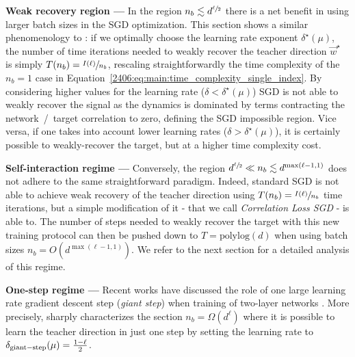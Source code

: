 \textbf{Weak recovery region ---} In the region $n_b \lesssim d^{\sfrac{\ell}{2}}$ there is a net benefit in using larger batch sizes in the SGD optimization. 
This section shows a similar phenomenology to \cite{arous2021online}: if we optimally choose the learning rate exponent $\delta^\star(\mu)$, the number of time iterations needed to weakly recover the teacher direction $\vec w^\star$ is simply $T(n_b) = \sfrac{I(\ell)}{n_b}$, rescaling straightforwardly the time complexity of the $n_b=1$ case in Equation~\eqref{2406:eq:main:time_complexity_single_index}. By considering higher values for the learning rate ($\delta < \delta^\star(\mu)$) SGD is not able to weakly recover the signal as the dynamics is dominated by terms contracting the network~/~target correlation to zero, defining the SGD impossible region. Vice versa, if one takes into account lower learning rates ($\delta > \delta^\star(\mu)$), it is certainly possible to weakly-recover the target, but at a higher time complexity cost. 

\textbf{Self-interaction regime --- } Conversely, the region $d^{\sfrac{\ell}{2}} \ll n_b \lesssim d^{{\rm max} (\ell-1,1)}$ does not adhere to the same straightforward paradigm. 
Indeed, standard SGD is not able to achieve weak recovery of the teacher direction using $T(n_b)  =  \sfrac{I(\ell)}{n_b}$ time iterations, but a simple modification of it - that we call \emph{Correlation Loss SGD} - is able to. The number of steps needed to weakly recover the target with this new training protocol can then be pushed down to \(T=\mathrm{polylog}(d)\) when using batch sizes $n_b = O(d^{\max (\ell-1,1)})$. We refer to the next section for a detailed analysis of this regime.
 
\textbf{One-step regime ---} Recent works have discussed the role of one large learning rate gradient descent step (\textit{giant step}) when training of two-layer networks \citep{ba2022high,damian2022neural,dandi2023how}. More precisely, \cite{dandi2023how} sharply characterizes the section $n_b = \Omega(d^{\ell})$ where it is possible to learn the teacher direction in just one step by setting the learning rate to $\delta_{\rm{giant-step}}(\mu) = \frac{1-\ell}{2}$. 



